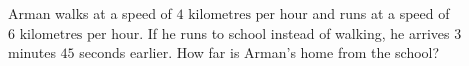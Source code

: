 Arman walks at a speed of $4\text{ kilometres per hour}$ and runs at a speed of $6\text{ kilometres per hour}$. If he runs to school instead of walking, he arrives $3$ minutes $45$ seconds earlier. How far is Arman's home from the school?
